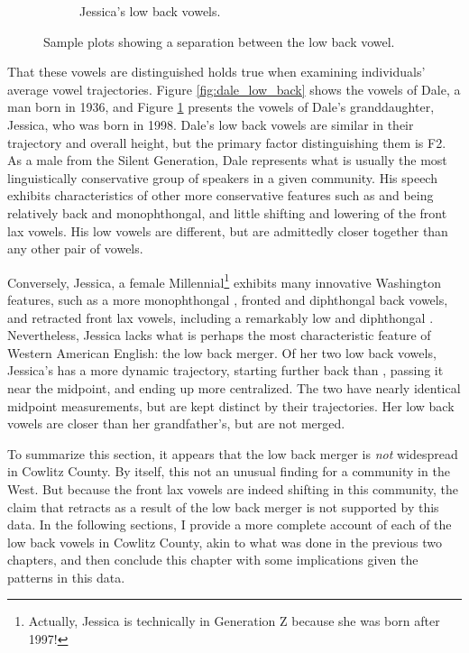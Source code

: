 \begin{figure}[tb!]
\begin{subfigure}[t]{2.925in}
        \caption{Jessica's low back vowels.}
        \label{fig:jessica_low_back}
    \end{subfigure}
    \hspace{\fill}
    \caption{Sample plots showing a separation between the low back vowel.}
    \label{fig:dale_and_jessica}
\end{figure}

That these vowels are distinguished holds true when examining individuals' average vowel trajectories. Figure \ref{fig:dale_low_back} shows the vowels of Dale, a man born in 1936, and Figure \ref{fig:jessica_low_back} presents the vowels of Dale's granddaughter, Jessica, who was born in 1998. Dale's low back vowels are similar in their trajectory and overall height, but the primary factor distinguishing them is F2. As a male from the Silent Generation, Dale represents what is usually the most linguistically conservative group of speakers in a given community. His speech exhibits characteristics of other more conservative features such as \goose and \goat being relatively back and monophthongal, and little shifting and lowering of the front lax vowels. His low vowels are different, but are admittedly closer together than any other pair of vowels.

Conversely, Jessica, a female Millennial\footnote{Actually, Jessica is technically in Generation Z because she was born after 1997!} exhibits many innovative Washington features, such as a more monophthongal \face, fronted and diphthongal back vowels, and retracted front lax vowels, including a remarkably low and diphthongal \bat. Nevertheless, Jessica lacks what is perhaps the most characteristic feature of Western American English: the low back merger. Of her two low back vowels, Jessica's \thought has a more dynamic trajectory, starting further back than \lot, passing it near the midpoint, and ending up more centralized. The two have nearly identical midpoint measurements, but are kept distinct by their trajectories. Her low back vowels are closer than her grandfather's, but are not merged.

To summarize this section, it appears that the low back merger is \textit{not} widespread in Cowlitz County. By itself, this not an unusual finding for a community in the West. But because the front lax vowels are indeed shifting in this community, the claim that \bat retracts as a result of the low back merger is not supported by this data. In the following sections, I provide a more complete account of each of the low back vowels in Cowlitz County, akin to what was done in the previous two chapters, and then conclude this chapter with some implications given the patterns in this data.






